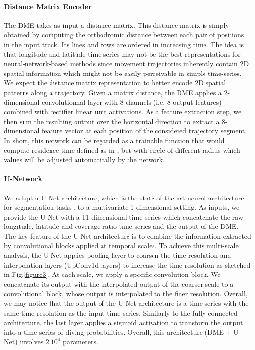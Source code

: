 \documentclass{article}
\begin{document}
\paragraph{Distance Matrix Encoder}
The DME takes as input a distance matrix.
This distance matrix is simply obtained by computing the orthodromic distance between each pair of positions in the input track. Its lines and rows are ordered in increasing time.
The idea is that longitude and latitude time-series may not be the best representations for neural-network-based methods since movement trajectories inherently contain 2D spatial information which might not be easily perceivable in simple time-series.
We expect the distance matrix representation to better encode 2D spatial patterns along a trajectory. 
Given a matrix distance, the DME applies a 2-dimensional convolutionnal layer with 8 channels (i.e. 8 output features) combined with rectifier linear unit activations.
As a feature extraction step, we then sum the resulting output over the horizontal direction to extract a 8-dimensional feature vector at each position of the considered trajectory segment.
In short, this network can be regarded as a trainable function that would compute residence time defined as in \citep{barraquand_animal_2008}, but with circle of different radius which values will be adjusted automatically by the network.

\paragraph{U-Network}
We adapt a U-Net architecture, which is the state-of-the-art neural architecture for segmentation tasks \citep{ronneberger_u-net_2015}, to a multivariate 1-dimensional setting.
As inputs, we provide the U-Net with a 11-dimensional time series which concatenate the raw longitude, latitude and coverage ratio time series and the output of the DME. The key feature of the U-Net architecture is to combine the information extracted by convolutional blocks applied at temporal scales. To achieve this multi-scale analysis, the U-Net applies pooling layer to coarsen the time resolution and interpolation layers (UpConv1d layers) to increase the time resolution as sketched in Fig.\ref{figure3}. At each scale, we apply a specific convolution block. We concatenate its output with the interpolated output of the coarser scale to a convolutional block, whose output is interpolated to the finer resolution. Overall, we may notice that the output of the U-Net architecture is a time series with the same time resolution as the input time series. Similarly to the fully-connected architecture, the last layer applies a sigmoïd activation to transform the output into a time series of diving probabilities. Overall, this architecture (DME + U-Net) involves $2.10^{4}$ parameters.
\end{document}
